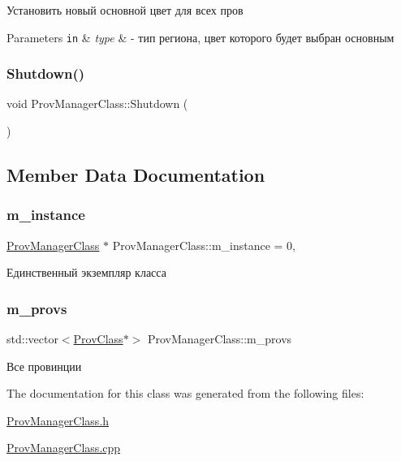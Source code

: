 Установить новый основной цвет для всех пров 


\begin{DoxyParams}[1]{Parameters}
\mbox{\tt in}  & {\em type} & -\/ тип региона, цвет которого будет выбран основным \\
\hline
\end{DoxyParams}
\mbox{\label{class_prov_manager_class_a0a5545af9d67178670644dd3323d1d99}} 
\subsubsection{\texorpdfstring{Shutdown()}{Shutdown()}}
{\footnotesize\ttfamily void Prov\+Manager\+Class\+::\+Shutdown (\begin{DoxyParamCaption}{ }\end{DoxyParamCaption})}



\subsection{Member Data Documentation}
\mbox{\label{class_prov_manager_class_a825e74c565a9c73901d75eb9e0cf5975}} 
\subsubsection{\texorpdfstring{m\+\_\+instance}{m\_instance}}
{\footnotesize\ttfamily \hyperlink{class_prov_manager_class}{Prov\+Manager\+Class} $\ast$ Prov\+Manager\+Class\+::m\+\_\+instance = 0\hspace{0.3cm}{\ttfamily [static]}, {\ttfamily [private]}}



Единственный экземпляр класса 

\mbox{\label{class_prov_manager_class_a112642cf6b7476f89373c6ac796e3375}} 
\subsubsection{\texorpdfstring{m\+\_\+provs}{m\_provs}}
{\footnotesize\ttfamily std\+::vector$<$\hyperlink{class_prov_class}{Prov\+Class}$\ast$$>$ Prov\+Manager\+Class\+::m\+\_\+provs\hspace{0.3cm}{\ttfamily [private]}}



Все провинции 



The documentation for this class was generated from the following files\+:\begin{DoxyCompactItemize}
\item 
\hyperlink{_prov_manager_class_8h}{Prov\+Manager\+Class.\+h}\item 
\hyperlink{_prov_manager_class_8cpp}{Prov\+Manager\+Class.\+cpp}\end{DoxyCompactItemize}
